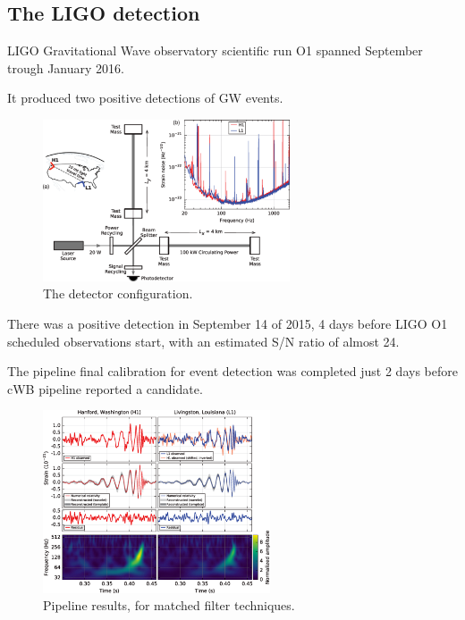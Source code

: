 \documentclass[10pt]{beamer}
\begin{document}
\subsection{The LIGO detection}
\begin{frame}
LIGO Gravitational Wave observatory scientific run O1 
spanned September trough January 2016.

It produced two positive detections of GW events.
\begin{figure}%
 \centering
 \includegraphics[width=0.65\textwidth]{./slides/plots/medium.png}
 \caption{\scriptsize{The detector configuration. }} 
\end{figure}
\end{frame}
\begin{frame}
There was a positive detection in September 14 of 2015, 4 days
before LIGO O1 scheduled observations start, with an estimated
S/N ratio of almost 24.

The pipeline final calibration for event detection was completed 
just 2 days before cWB pipeline reported a candidate.

\begin{figure}%
 \centering
 \includegraphics[width=0.6\textwidth]{./slides/plots/medium_fp.png}
 \caption{\scriptsize{Pipeline results, for matched filter techniques.}} 
 
\end{figure}
\end{frame}
\end{document}
